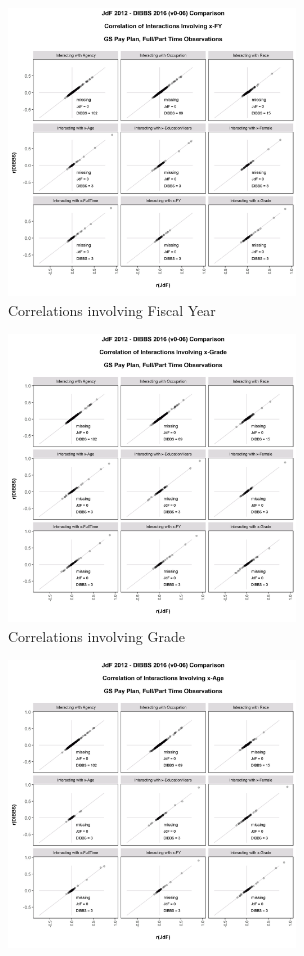 \documentclass[10pt, letterpaper]{article}
\begin{document}
\begin{spacing}{1.0}
\begin{figure}[ht]
    \centering
    \begin{subfigure}{.5\textwidth}
        \centering
        \includegraphics[width=3in, trim={0 0.25in 0 1in}, clip]{JdFDIBBSCorrelationInteraction-x-FY.png}
        \caption{Correlations involving Fiscal Year}
        \vspace{10pt}
    \end{subfigure}%
    \begin{subfigure}{.5\textwidth}
        \centering
        \includegraphics[width=3in, trim={0 0.25in 0 1in}, clip]{JdFDIBBSCorrelationInteraction-x-Grade.png}
        \caption{Correlations involving Grade}
        \vspace{10pt}
    \end{subfigure}
    \begin{subfigure}{.5\textwidth}
        \centering
        \includegraphics[width=3in, trim={0 0.25in 0 1in}, clip]{JdFDIBBSCorrelationInteraction-x-Age.png}

\end{subfigure}
\end{figure}
\end{spacing}
\end{document}
